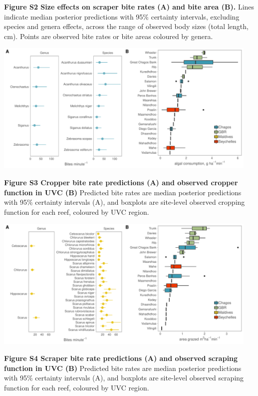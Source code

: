 \documentclass[12pt,]{article}
\begin{document}
\textbf{Figure S2 \textbar{} Size effects on scraper bite rates (A) and
bite area (B).} Lines indicate median posterior predictions with 95\%
certainty intervals, excluding species and genera effects, across the
range of observed body sizes (total length, cm). Points are observed
bite rates or bite areas coloured by genera.

\newpage

\begin{center}\includegraphics[width=480px]{../../figures/FigureS2_cropper_bites} \end{center}

\textbf{Figure S3 \textbar{} Cropper bite rate predictions (A) and
observed cropper function in UVC (B)} Predicted bite rates are median
posterior predictions with 95\% certainty intervals (A), and boxplots
are site-level observed cropping function for each reef, coloured by UVC
region.

\newpage

\begin{center}\includegraphics[width=480px]{../../figures/FigureS3_scraper_bites} \end{center}

\textbf{Figure S4 \textbar{} Scraper bite rate predictions (A) and
observed scraping function in UVC (B)} Predicted bite rates are median
posterior predictions with 95\% certainty intervals (A), and boxplots
are site-level observed scraping function for each reef, coloured by UVC
region.

\newpage
\end{document}
